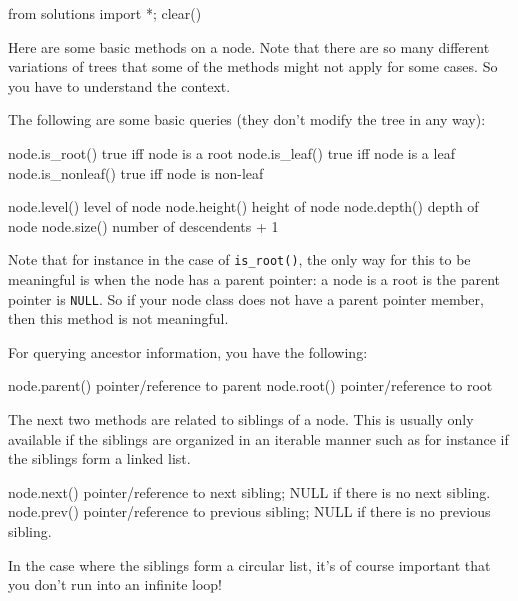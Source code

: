 \begin{python0}
from solutions import *; clear()
\end{python0}

Here are some basic methods on a node.
Note that there are so many different variations of trees
that some of the methods might not apply for some cases.
So you have to understand the context.

The following are some basic queries (they don't modify the 
tree in any way):

\begin{console}
node.is_root()           true iff node is a root
node.is_leaf()           true iff node is a leaf
node.is_nonleaf()        true iff node is non-leaf

node.level()             level of node
node.height()            height of node
node.depth()             depth of node
node.size()              number of descendents + 1
\end{console}

Note that for instance in the case of \texttt{is\_root()},
the only way for this to be meaningful is when the node
has a parent pointer: a node is a root is the parent pointer
is \texttt{NULL}.
So if your node class does not have a parent pointer
member, then this method is not meaningful.

For querying ancestor information, you have the following:
\begin{console}
node.parent()            pointer/reference to parent
node.root()              pointer/reference to root 
\end{console}

The next two methods are related to siblings of a node.
This is usually only available if the siblings are
organized in an iterable manner such as for instance
if the siblings form a linked list.
\begin{console}
node.next()              pointer/reference to next 
                         sibling; NULL if there is no 
                         next sibling.
node.prev()              pointer/reference to previous 
                         sibling; NULL if there is no
                         previous sibling.
\end{console}
In the case where the siblings form a circular list, 
it's of course important that you don't run into an infinite loop!

